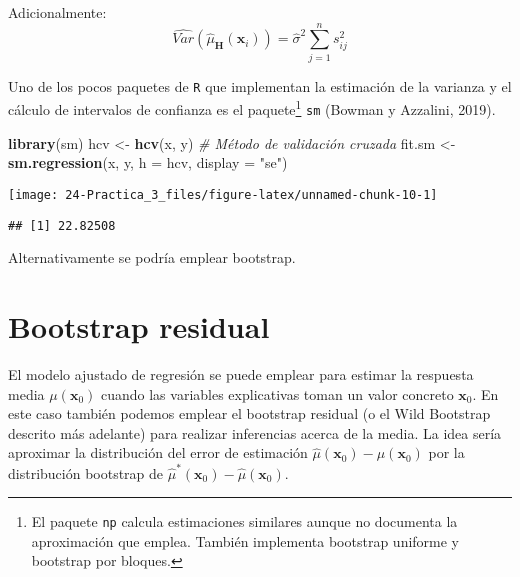 \documentclass[
]{book}
\newenvironment{Shaded}{\begin{snugshade}}{\end{snugshade}}
\newcommand{\CommentTok}[1]{\textcolor[rgb]{0.56,0.35,0.01}{\textit{#1}}}
\newcommand{\DataTypeTok}[1]{\textcolor[rgb]{0.13,0.29,0.53}{#1}}
\newcommand{\KeywordTok}[1]{\textcolor[rgb]{0.13,0.29,0.53}{\textbf{#1}}}
\newcommand{\NormalTok}[1]{#1}
\newcommand{\OperatorTok}[1]{\textcolor[rgb]{0.81,0.36,0.00}{\textbf{#1}}}
\newcommand{\StringTok}[1]{\textcolor[rgb]{0.31,0.60,0.02}{#1}}
\theoremstyle{definition}
\theoremstyle{definition}
\theoremstyle{definition}
\theoremstyle{remark}
\begin{document}
Adicionalmente:
\[\widehat{Var}\left(\hat{\mu}_{\mathbf{H}}(\mathbf{x}_i)\right) = \hat\sigma^2\sum_{j=1}^n s^2_{ij}\]

Uno de los pocos paquetes de \texttt{R} que implementan la estimación de la varianza
y el cálculo de intervalos de confianza es el paquete\footnote{El paquete \texttt{np} calcula
  estimaciones similares aunque no documenta la aproximación que emplea. También
  implementa bootstrap uniforme y bootstrap por bloques.} \texttt{sm} (Bowman y Azzalini, 2019).

\begin{Shaded}
\begin{Highlighting}[]
\KeywordTok{library}\NormalTok{(sm)}
\NormalTok{hcv <-}\StringTok{ }\KeywordTok{hcv}\NormalTok{(x, y) }\CommentTok{# Método de validación cruzada}
\NormalTok{fit.sm <-}\StringTok{ }\KeywordTok{sm.regression}\NormalTok{(x, y, }\DataTypeTok{h =}\NormalTok{ hcv, }\DataTypeTok{display =} \StringTok{"se"}\NormalTok{)}
\end{Highlighting}
\end{Shaded}

\begin{center}\texttt{[image: 24-Practica\_3\_files/figure-latex/unnamed-chunk-10-1]} \end{center}

\begin{Shaded}
\end{Shaded}

\begin{verbatim}
## [1] 22.82508
\end{verbatim}

Alternativamente se podría emplear bootstrap.

\hypertarget{bootstrap-residual}{%
\section{Bootstrap residual}\label{bootstrap-residual}}

El modelo ajustado de regresión se puede emplear para estimar la respuesta media
\(\mu(\mathbf{x}_0)\) cuando las variables explicativas toman un valor concreto \(\mathbf{x}_0\).
En este caso también podemos emplear el bootstrap residual (o el Wild Bootstrap
descrito más adelante) para realizar inferencias acerca de la media.
La idea sería aproximar la distribución del error de estimación
\(\hat\mu(\mathbf{x}_0) - \mu(\mathbf{x}_0)\) por la distribución bootstrap de
\(\hat\mu^{\ast}(\mathbf{x}_0) - \hat\mu(\mathbf{x}_0)\).
\end{document}
